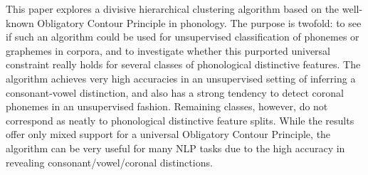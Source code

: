 This paper explores a divisive hierarchical clustering algorithm based on the well-known Obligatory Contour Principle in phonology.  The purpose is twofold: to see if such an algorithm could be used for unsupervised classification of phonemes or graphemes in corpora, and to investigate whether this purported universal constraint really holds for several classes of phonological distinctive features.  The algorithm achieves very high accuracies in an unsupervised setting of inferring a consonant-vowel distinction, and also has a strong tendency to detect coronal phonemes in an unsupervised fashion. Remaining classes, however, do not correspond as neatly to phonological distinctive feature splits.  While the results offer only mixed support for a universal Obligatory Contour Principle, the algorithm can be very useful for many NLP tasks due to the high accuracy in revealing consonant/vowel/coronal distinctions.
